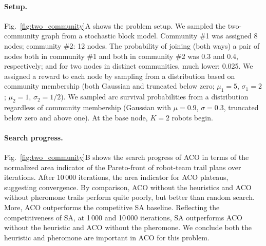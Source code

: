 \documentclass[fleqn,10pt,lineno]{wlpeerj}
\begin{document}
\paragraph{Setup.}
Fig.~\ref{fig:two_community}A shows the problem setup.
We sampled the two-community graph from a stochastic block model. Community \#1 was assigned 8 nodes; community \#2: 12 nodes.
The probability of joining (both ways) a pair of nodes both in community \#1 and both in community \#2 was 0.3 and 0.4, respectively; and for two nodes in distinct communities, much lower: 0.025.
We assigned a reward to each node by sampling from a distribution based on community membership (both Gaussian and truncated below zero; $\mu_1=5$, $\sigma_1=2$; $\mu_2=1$, $\sigma_2=1/2$).
We sampled arc survival probabilities from a distribution regardless of community membership (Gaussian with $\mu=0.9$, $\sigma=0.3$, truncated below zero and above one). At the base node, $K=2$ robots begin.


\paragraph{Search progress.}
Fig.~\ref{fig:two_community}B shows the search progress of ACO in terms of the normalized area indicator of the Pareto-front of robot-team trail plans over iterations. After 10\,000 iterations, the area indicator for ACO plateaus, suggesting convergence. By comparison, ACO without the heuristics and ACO without pheromone trails perform quite poorly, but better than random search. 
More, ACO outperforms the competitive SA baseline.
Reflecting the competitiveness of SA, at 1\,000 and 10\,000 iterations, SA outperforms ACO without the heuristic and ACO without the pheromone.  
We conclude both the heuristic and pheromone are important in ACO for this problem.
\end{document}
